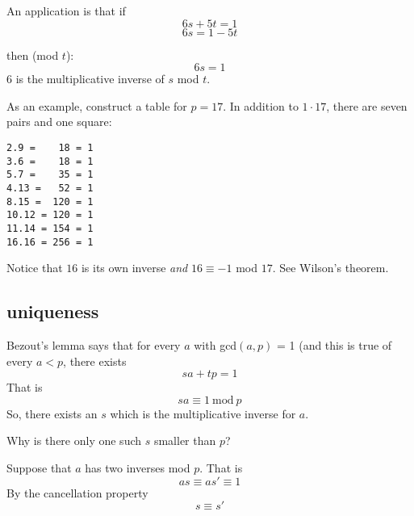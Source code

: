 \documentclass[11pt, oneside]{article}
\begin{document}
An application is that if
\[ 6s + 5t = 1 \]
\[ 6s = 1 - 5t \]
    
then (mod $t$):
\[ 6s = 1 \]
$6$ is the multiplicative inverse of $s$ mod $t$.

As an example, construct a table for $p = 17$.  In addition to $1 \cdot 17$, there are seven pairs and one square:

\begin{verbatim}
2.9 =    18 = 1
3.6 =    18 = 1
5.7 =    35 = 1
4.13 =   52 = 1
8.15 =  120 = 1
10.12 = 120 = 1
11.14 = 154 = 1
16.16 = 256 = 1
\end{verbatim}

Notice that $16$ is its own inverse \emph{and} $16 \equiv -1$ mod $17$.  See Wilson's theorem.

\subsection*{uniqueness}

Bezout's lemma says that for every $a$ with gcd$(a,p)$ = 1 (and this is true of every $a < p$, there exists 
\[ sa + tp = 1 \]
That is
\[ sa \equiv 1  \ \text{mod} \ p  \]
So, there exists an $s$ which is the multiplicative inverse for $a$.

Why is there only one such $s$ smaller than $p$?

Suppose that $a$ has two inverses mod $p$.  That is
\[ as \equiv as' \equiv 1 \]
By the cancellation property 
\[ s \equiv s' \]
\end{document}
